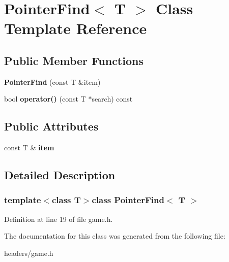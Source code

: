 \hypertarget{classPointerFind}{\section{Pointer\+Find$<$ T $>$ Class Template Reference}
\label{classPointerFind}
}
\subsection*{Public Member Functions}
\begin{DoxyCompactItemize}
\item 
\hypertarget{classPointerFind_a5be2db8f77c0f3f978fd0da0552fda6d}{{\bfseries Pointer\+Find} (const T \&item)}\label{classPointerFind_a5be2db8f77c0f3f978fd0da0552fda6d}

\item 
\hypertarget{classPointerFind_a726ce10f14691536e2f09b3042a9e137}{bool {\bfseries operator()} (const T $\ast$search) const }\label{classPointerFind_a726ce10f14691536e2f09b3042a9e137}

\end{DoxyCompactItemize}
\subsection*{Public Attributes}
\begin{DoxyCompactItemize}
\item 
\hypertarget{classPointerFind_a70b8fde7d321ac4a3b037c7ea8da85a5}{const T \& {\bfseries item}}\label{classPointerFind_a70b8fde7d321ac4a3b037c7ea8da85a5}

\end{DoxyCompactItemize}


\subsection{Detailed Description}
\subsubsection*{template$<$class T$>$class Pointer\+Find$<$ T $>$}



Definition at line 19 of file game.\+h.



The documentation for this class was generated from the following file\+:\begin{DoxyCompactItemize}
\item 
headers/game.\+h\end{DoxyCompactItemize}
